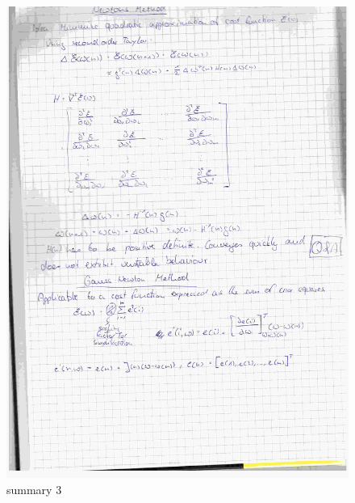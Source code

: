 \documentclass[paper=a4, fontsize=11pt]{scrartcl} %
\numberwithin{equation}{section} %
\numberwithin{figure}{section} %
\numberwithin{table}{section} %
\begin{document}
\begin{figure}[ht]
	\centering
  \includegraphics[width=0.7\textheight]{06.jpg}
	\caption{summary 3}
	\label{fig3}
\end{figure}
\end{document}
